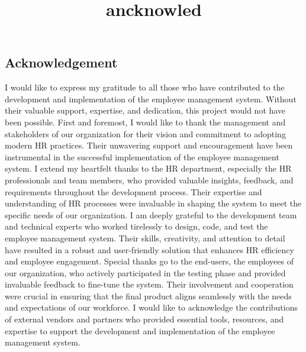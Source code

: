 \title{ancknowled}
\begin{center}
    \section*{Acknowledgement}
\end{center}
\vspace{5.5mm}
I would like to express my gratitude to all those who have contributed to the development and implementation of the employee management system. Without their valuable support, expertise, and dedication, this project would not have been possible. First and foremost, I would like to thank the management and stakeholders of our organization for their vision and commitment to adopting modern HR practices. Their unwavering support and encouragement have been instrumental in the successful implementation of the employee management system. I extend my heartfelt thanks to the HR department, especially the HR professionals and team members, who provided valuable insights, feedback, and requirements throughout the development process. Their expertise and understanding of HR processes were invaluable in shaping the system to meet the specific needs of our organization. I am deeply grateful to the development team and technical experts who worked tirelessly to design, code, and test the employee management system. Their skills, creativity, and attention to detail have resulted in a robust and user-friendly solution that enhances HR efficiency and employee engagement. Special thanks go to the end-users, the employees of our organization, who actively participated in the testing phase and provided invaluable feedback to fine-tune the system. Their involvement and cooperation were crucial in ensuring that the final product aligns seamlessly with the needs and expectations of our workforce. I would like to acknowledge the contributions of external vendors and partners who provided essential tools, resources, and expertise to support the development and implementation of the employee management system.
